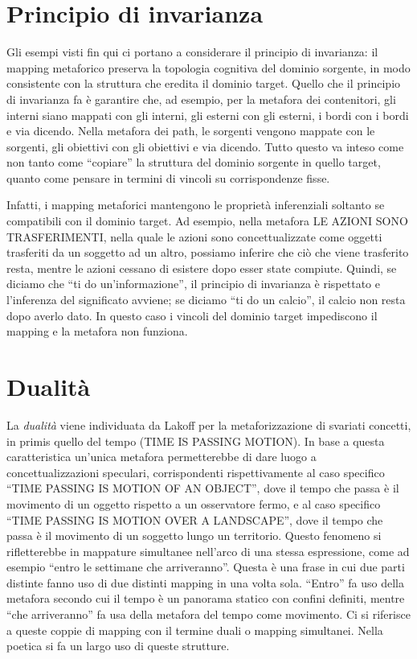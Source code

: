 \section{Principio di invarianza}
Gli esempi visti fin qui ci portano a considerare il principio di invarianza: il mapping metaforico preserva la topologia cognitiva del dominio sorgente, in modo consistente con la struttura che eredita il dominio target. Quello che il principio di invarianza fa è garantire che, ad esempio, per la metafora dei contenitori, gli interni siano mappati con gli interni, gli esterni con gli esterni, i bordi con i bordi e via dicendo. Nella metafora dei path, le sorgenti vengono mappate con le sorgenti, gli obiettivi con gli obiettivi e via dicendo. Tutto questo va inteso come non tanto come ``copiare'' la struttura del dominio sorgente in quello target, quanto come pensare in termini di vincoli su corrispondenze fisse.

Infatti, i mapping metaforici mantengono le proprietà inferenziali soltanto se compatibili con il dominio target. Ad esempio, nella metafora LE AZIONI SONO TRASFERIMENTI, nella quale le azioni sono concettualizzate come oggetti trasferiti da un soggetto ad un altro, possiamo inferire che ciò che viene trasferito resta, mentre le azioni cessano di esistere dopo esser state compiute. Quindi, se diciamo che ``ti do un'informazione'', il principio di invarianza è rispettato e l'inferenza del significato avviene; se diciamo ``ti do un calcio'', il calcio non resta dopo averlo dato. In questo caso i vincoli del dominio target impediscono il mapping e la metafora non funziona.

\section{Dualità}
La \emph{dualità} viene individuata da Lakoff per la metaforizzazione di svariati concetti, in primis quello del tempo (TIME IS PASSING MOTION). In base a questa caratteristica un'unica metafora permetterebbe di dare luogo a concettualizzazioni speculari, corrispondenti rispettivamente al caso specifico ``TIME PASSING IS MOTION OF AN OBJECT'', dove il tempo che passa è il movimento di un oggetto rispetto a un osservatore fermo, e al caso specifico  ``TIME PASSING IS MOTION OVER A LANDSCAPE'', dove il tempo che passa è il movimento di un soggetto lungo un territorio. Questo fenomeno si rifletterebbe in mappature simultanee nell'arco di una stessa espressione, come ad esempio ``entro le settimane che arriveranno''. Questa è una frase in cui due parti distinte fanno uso di due distinti mapping in una volta sola. “Entro” fa uso della metafora secondo cui il tempo è un panorama statico con confini definiti, mentre “che arriveranno” fa usa della metafora del tempo come movimento. Ci si riferisce a queste coppie di mapping con il termine duali o mapping simultanei. Nella poetica si fa un largo uso di queste strutture.

